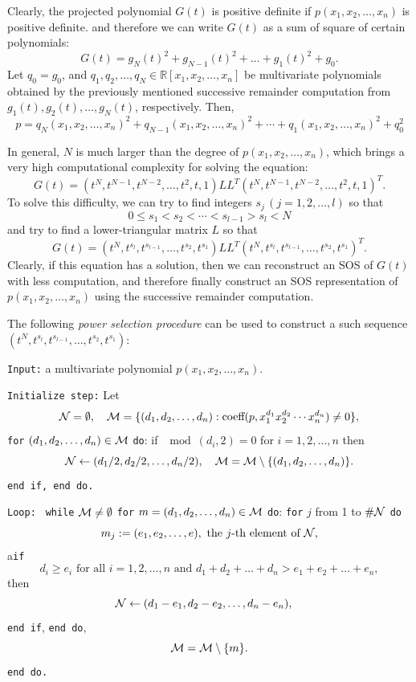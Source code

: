 \documentclass[runningheads]{llncs}
\begin{document}
{Clearly, the projected polynomial $G(t)$ is positive definite if $p(x_1,x_2,\ldots,x_n)$ is positive definite. 
and therefore we can write $G(t)$ as a sum of square of certain polynomials: 
\[
G(t) = g_N(t)^2 + g_{N-1}(t)^2 + \ldots + g_1(t)^2 + g_0.
\]
Let $q_0=g_0$, and $q_1,q_2,\ldots,q_N\in \mathbb{R}[x_1,x_2,\ldots,x_n]$ be multivariate polynomials obtained by the previously mentioned successive remainder computation from $g_1(t),g_2(t),\ldots,g_N(t)$, respectively. Then,
\begin{equation}
p=q_N(x_1,x_2,\ldots,x_n)^2+q_{N-1}(x_1,x_2,\ldots,x_n)^2+\cdots+q_1(x_1,x_2,\ldots,x_n)^2+q_0^2
\label{eq-proj-lift}    
\end{equation}

In general, $N$ is much larger than the degree of $p(x_1,x_2,\ldots,x_n)$, which brings a very high computational complexity for solving the equation:
$$
G(t)=(t^N,t^{N-1},t^{N-2},\ldots,t^2,t,1)LL^T(t^N,t^{N-1},t^{N-2},\ldots,t^2,t,1)^T.
$$
To solve this difficulty, we can try to find
integers $s_j\,(j=1,2,\ldots,l)$ so that  
$$
0\leq {s_1}<{s_2}<\cdots< s_{l-1}>{s_l}<N
$$
and try to find a lower-triangular matrix $L$
so that 
$$
G(t)=
(t^{N}, t^{s_l},t^{s_{l-1}}, \ldots,t^{s_2},t^{s_{1}})
LL^T
(t^{N}, t^{s_l},t^{s_{l-1}}, \ldots,t^{s_2},t^{s_{1}})^T.
$$
Clearly, if this equation has a solution, then we can reconstruct an SOS of $G(t)$ with less computation, and therefore finally construct an SOS representation of $p(x_1,x_2,\ldots,x_n)$ using the successive remainder computation. 

The following  {\it power selection procedure\/} can be used to construct a such sequence $(t^{N}, t^{s_l},t^{s_{l-1}}, \ldots,t^{s_2},t^{s_{1}})$:

{\tt Input:} a multivariate polynomial $p(x_1,x_2,\ldots,x_n)$. 

{\tt Initialize step:}  Let
$$
{\cal N}=\emptyset,
\quad 
{\cal M}=\{(d_1,d_2,\ldots,d_n): \text{coeff}(p,x_1^{d_1}x_2^{d_2}\cdots x_n^{d_n})\not=0\}, 
$$
{\tt for} $(d_1,d_2,\ldots,d_n)\in {\cal M}$ {\tt do}: 
if $\mod(d_i,2)=0$ for $i=1,2,\ldots,n$ then 
$$
{\cal N}\leftarrow (d_1/2,d_2/2,\ldots,d_n/2),\quad
{\cal M}={\cal M}\setminus\{(d_1,d_2,\ldots,d_n)\}.
$$
{\tt end if, end do.}

{\tt Loop: } {\tt while} ${\cal M}\not=\emptyset$ {\tt for} $m=(d_1,d_2,\ldots,d_n)\in {\cal M}$ {\tt do}: {\tt for} $j$ from 1 to $\#{\cal N}$ {\tt do} 
$$
m_j:=(e_1,e_2,\ldots,e),
\text{ the $j$-th element of } {\cal N}, 
$$
a{\tt if }
$$
d_i\geq e_i \text{ for all } i=1,2,\ldots,n \text{ and }
d_1+d_2+\ldots+d_n>e_1+e_2+\ldots+e_n,
$$
then
$$
{\cal N}\leftarrow 
(d_1-e_1,d_2-e_2,\ldots,d_n-e_n), 
\quad
$$
{\tt end if}, {\tt end do}, 
$$
{\cal M}={\cal M}\setminus \{m\}.
$$
{\tt end do.}

}
\end{document}
